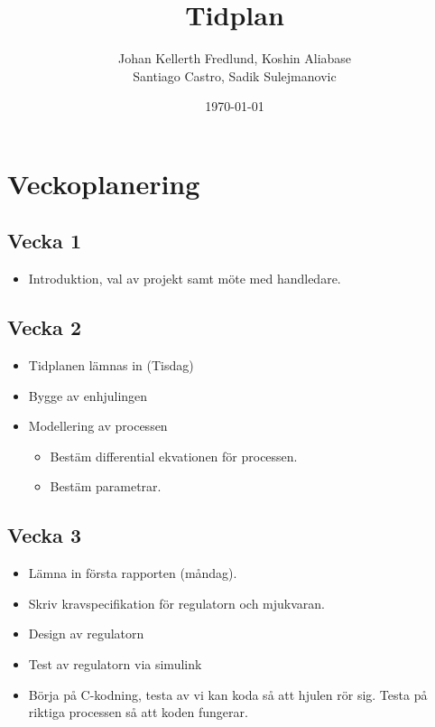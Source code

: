 \documentclass[a4paper]{article}
\title{Tidplan}
\author{Johan Kellerth Fredlund, Koshin Aliabase\\ Santiago Castro, Sadik Sulejmanovic}
\date{\today}
\begin{document}
\maketitle



\section{Veckoplanering}

	\subsection*{Vecka 1}
    
    \begin{itemize}
    \item Introduktion, val av projekt samt möte med handledare.
	\end{itemize}

	\subsection*{Vecka 2}

	\begin{itemize}
    \item Tidplanen lämnas in (Tisdag)
    \item Bygge av enhjulingen
    \item Modellering av processen
    	\begin{itemize}
		\item Bestäm differential ekvationen för processen.
    	\item Bestäm parametrar.
		\end{itemize}        
	\end{itemize}
    
    \subsection*{Vecka 3}
    \begin{itemize}
    \item Lämna in första rapporten (måndag).
	\item Skriv kravspecifikation för regulatorn och mjukvaran.
    \item Design av regulatorn
    \item Test av regulatorn via simulink
    \item Börja på C-kodning, testa av vi kan koda så att hjulen rör sig. Testa på riktiga processen så att koden fungerar.
	\end{itemize}
    
\end{document}
